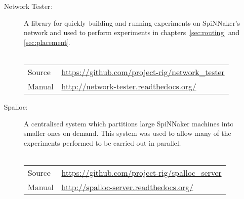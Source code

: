 \begin{description}
		\item [Network Tester:] A library for quickly building and running
		experiments on SpiNNaker's network and used to perform experiments in
		chapters~\ref{sec:routing} and \ref{sec:placement}.
		\\
		\vspace*{-1.25em}
		\\
		\begin{tabular}{ll}
			Source & \url{https://github.com/project-rig/network_tester} \\
			Manual & \url{http://network-tester.readthedocs.org/} \\
		\end{tabular}
		
		\item [Spalloc:] A centralised system which partitions large SpiNNaker
		machines into smaller ones on demand. This system was used to allow many of
		the experiments performed to be carried out in parallel.
		\\
		\vspace*{-1.25em}
		\\
		\begin{tabular}{ll}
			Source & \url{https://github.com/project-rig/spalloc_server} \\
			Manual & \url{http://spalloc-server.readthedocs.org/} \\
		\end{tabular}
		
	\end{description}
